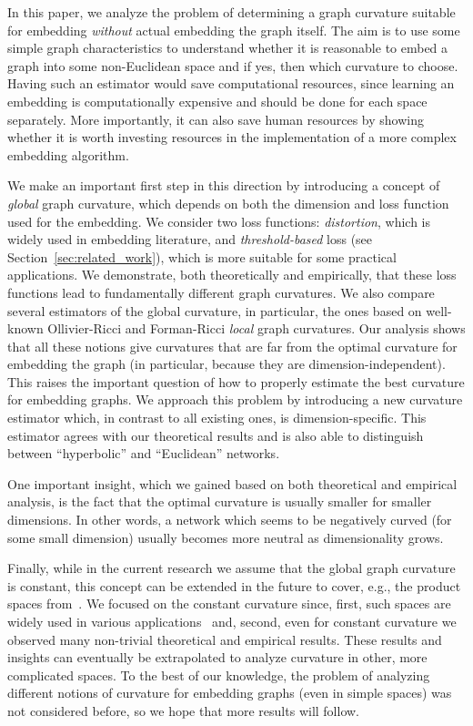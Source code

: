 \documentclass{article} %
\begin{document}
In this paper, we analyze the problem of determining a graph curvature suitable for embedding \textit{without} actual embedding the graph itself. The aim is to use some simple graph characteristics to understand whether it is reasonable to embed a graph into some non-Euclidean space and if yes, then which curvature to choose. 
Having such an estimator would save computational resources, since learning an embedding is computationally expensive and should be done for each space separately. 
More importantly, it can also save human resources by showing whether it is worth investing resources in the implementation of a more complex embedding algorithm.

We make an important first step in this direction by introducing a concept of \textit{global} graph curvature, which depends on both the dimension and loss function used for the embedding. We consider two loss functions: \emph{distortion}, which is widely used in embedding literature, and \emph{threshold-based} loss (see Section~\ref{sec:related_work}), which is more suitable for some practical applications. We demonstrate, both theoretically and empirically, that these loss functions lead to fundamentally different graph curvatures. 
We also compare several estimators of the global curvature, in particular, the ones based on well-known Ollivier-Ricci and Forman-Ricci \textit{local} graph curvatures. Our analysis shows that all these notions give curvatures that are far from the optimal curvature for embedding the graph (in particular, because they are dimension-independent). This raises the important question of how to properly estimate the best curvature for embedding graphs. 
We approach this problem by introducing a new curvature estimator which, in contrast to all existing ones, is dimension-specific. This estimator agrees with our theoretical results and is also able to distinguish between ``hyperbolic'' and ``Euclidean'' networks.

One important insight, which we gained based on both theoretical and empirical analysis, is the fact that the optimal curvature is usually smaller for smaller dimensions. In other words, a network which seems to be negatively curved (for some small dimension) usually becomes more neutral as dimensionality grows.

Finally, while in the current research we assume that the global graph curvature is constant, this concept can be extended in the future to cover, e.g., the product spaces from~\citep{gu2019learning}. We focused on the constant curvature since, first, such spaces are widely used in various applications~\citep{tifrea2018poincar} and, second, even for constant curvature we observed many non-trivial theoretical and empirical results.
These results and insights can eventually be extrapolated to analyze curvature in other, more complicated spaces. To the best of our knowledge, the problem of analyzing different notions of curvature for embedding graphs (even in simple spaces) was not considered before, so we hope that more results will follow.
\end{document}
